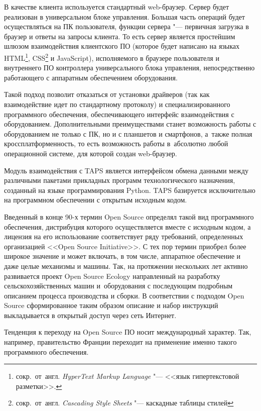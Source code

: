В качестве клиента используется стандартный \foreignlanguage{english}{web}-браузер. Сервер будет реализован в универсальном блоке управления. Большая часть операций будет осуществляться на ПК пользователя, функции сервера "--- первичная загрузка в браузер и ответы на запросы клиента. То есть сервер является простейшим шлюзом взаимодействия клиентского ПО (которое будет написано на языках \foreignlanguage{english}{HTML}\footnote{сокр.~от~англ. \textit{HyperText Markup Language} "--- <<язык гипертекстовой разметки>>.}, \foreignlanguage{english}{CSS}\footnote{сокр.~от~англ. \textit{Cascading Style Sheets} "--- каскадные таблицы стилей} и \foreignlanguage{english}{JavaScript}), исполняемого в браузере пользователя и внутреннего ПО контроллера универсального блока управления, непосредственно работающего с аппаратным обеспечением оборудования.

Такой подход позволит отказаться от установки драйверов (так как взаимодействие идет по стандартному протоколу) и специализированного программного обеспечения, обеспечивающего интерфейс взаимодействия с оборудованием. Дополнительными преимуществами станет возможность работы с оборудованием не только с ПК, но и с планшетов и смартфонов, а~также полная кроссплатформенность, то есть возможность работы в~абсолютно любой операционной системе, для которой создан \foreignlanguage{english}{web}-браузер.

Модуль взаимодействия с TAPS является интерфейсом обмена данными между различными пакетами прикладных программ технологического назначения, созданный на языке программирования Python. \foreignlanguage{english}{TAPS} базируется исключительно на программном обеспечении с открытым исходным кодом.

Введенный в конце 90-х термин Open Source определял такой вид программного обеспечения, дистрибуция которого осуществляется вместе с исходным кодом, а лицензия на его использование соответствует ряду требований, определенных организацией <<Open Source Initiative>>. С тех пор термин приобрел более широкое значение и может включать, в том числе, аппаратное обеспечение и даже целые механизмы и машины. Так, на протяжении нескольких лет активно развивается проект Open Source Ecology направленный на разработку сельскохозяйственных машин и~оборудования с последующим подробным описанием процесса производства и сборки. В соответствии с подходом Open Source сформированное таким образом описание и набор инструкций выкладывается в открытый доступ через сеть Интернет.

Тенденция к переходу на Open Source ПО носит международный характер. Так, например, правительство Франции переходит на применение именно такого программного обеспечения.

